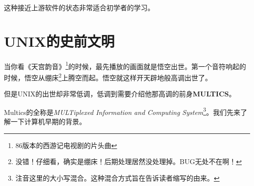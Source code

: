 \documentclass[amstex]{ctexbook}
\begin{document}
这种接近上游软件的状态非常适合初学者的学习。

\section{UNIX的史前文明}

当你看《天宫韵音》\footnote{86版本的西游记电视剧的片头曲}的时候，最先播放的画面就是悟空出世。第一个音符响起的时候，悟空从绷床\footnote{没错！仔细看，确实是绷床！后期处理居然没处理掉。BUG无处不在啊！}上腾空而起。悟空就这样开天辟地般高调出世了。

但是UNIX的出世却非常低调，低调到需要介绍他那高调的前身\textbf{MULTICS}。

Multics的全称是\textit{MULTiplexed Information and Computing System}\footnote{注音这里的大小写混合。这种混合方式旨在告诉读者缩写的由来。}。我们先来了解一下计算机早期的背景。
\end{document}
